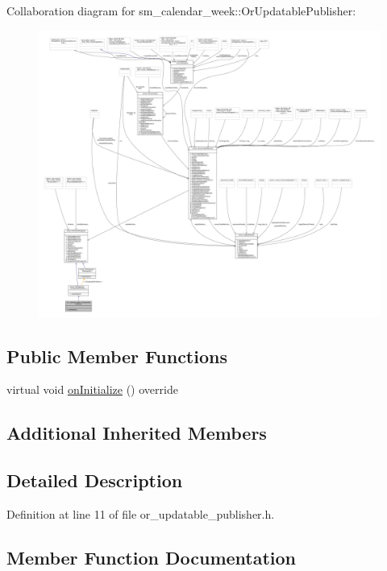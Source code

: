 Collaboration diagram for sm\+\_\+calendar\+\_\+week\+:\+:Or\+Updatable\+Publisher\+:
\nopagebreak
\begin{figure}[H]
\begin{center}
\leavevmode
\includegraphics[width=350pt]{classsm__calendar__week_1_1OrUpdatablePublisher__coll__graph}
\end{center}
\end{figure}
\subsection*{Public Member Functions}
\begin{DoxyCompactItemize}
\item 
virtual void \hyperlink{classsm__calendar__week_1_1OrUpdatablePublisher_a2a10370fff51b3f90a52dd3088eb6dd2}{on\+Initialize} () override
\end{DoxyCompactItemize}
\subsection*{Additional Inherited Members}


\subsection{Detailed Description}


Definition at line 11 of file or\+\_\+updatable\+\_\+publisher.\+h.



\subsection{Member Function Documentation}
